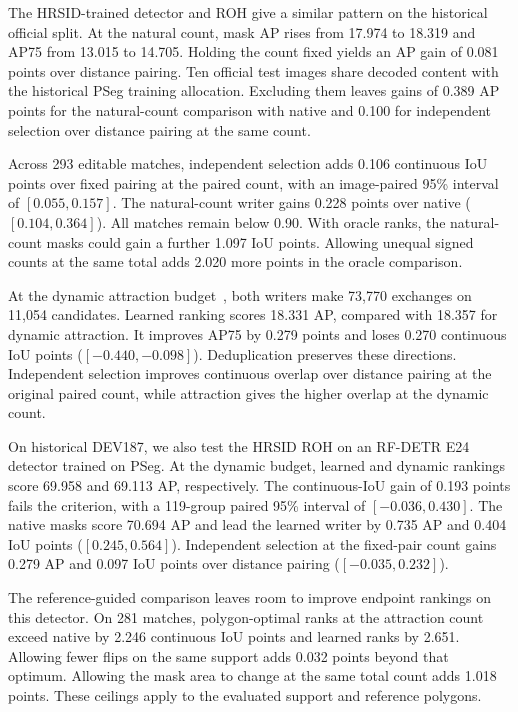 \documentclass[journal]{IEEEtran}
\begin{document}
The HRSID-trained detector and ROH give a similar pattern on the historical official split. At the natural count, mask AP rises from 17.974 to 18.319 and AP75 from 13.015 to 14.705. Holding the count fixed yields an AP gain of 0.081 points over distance pairing. Ten official test images share decoded content with the historical PSeg training allocation. Excluding them leaves gains of 0.389 AP points for the natural-count comparison with native and 0.100 for independent selection over distance pairing at the same count.

Across 293 editable matches, independent selection adds 0.106 continuous IoU points over fixed pairing at the paired count, with an image-paired 95\% interval of \mbox{\([0.055,0.157]\)}. The natural-count writer gains 0.228 points over native (\([0.104,0.364]\)). All matches remain below 0.90. With oracle ranks, the natural-count masks could gain a further 1.097 IoU points. Allowing unequal signed counts at the same total adds 2.020 more points in the oracle comparison.

At the dynamic attraction budget~\cite{atkinson}, both writers make 73,770 exchanges on 11,054 candidates. Learned ranking scores 18.331 AP, compared with 18.357 for dynamic attraction. It improves AP75 by 0.279 points and loses 0.270 continuous IoU points (\([-0.440,-0.098]\)). Deduplication preserves these directions. Independent selection improves continuous overlap over distance pairing at the original paired count, while attraction gives the higher overlap at the dynamic count.

On historical DEV187, we also test the HRSID ROH on an RF-DETR E24 detector trained on PSeg. At the dynamic budget, learned and dynamic rankings score 69.958 and 69.113 AP, respectively. The continuous-IoU gain of 0.193 points fails the criterion, with a 119-group paired 95\% interval of \([-0.036,0.430]\). The native masks score 70.694 AP and lead the learned writer by 0.735 AP and 0.404 IoU points (\([0.245,0.564]\)). Independent selection at the fixed-pair count gains 0.279 AP and 0.097 IoU points over distance pairing (\([-0.035,0.232]\)).

The reference-guided comparison leaves room to improve endpoint rankings on this detector. On 281 matches, polygon-optimal ranks at the attraction count exceed native by 2.246 continuous IoU points and learned ranks by 2.651. Allowing fewer flips on the same support adds 0.032 points beyond that optimum. Allowing the mask area to change at the same total count adds 1.018 points. These ceilings apply to the evaluated support and reference polygons.
\end{document}
